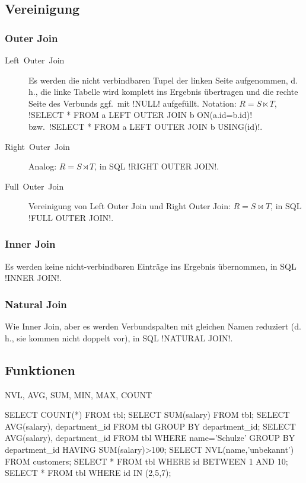 \subsection{Vereinigung}


\subsubsection{Outer Join}
\begin{description}
  \item [{Left~Outer~Join}] Es werden die nicht verbindbaren Tupel der linken Seite aufgenommen, d.\,h., die linke Tabelle wird komplett ins Ergebnis übertragen und die rechte Seite des Verbunds ggf.~mit \sqli!NULL! aufgefüllt.
  Notation: $R=S\ltimes T$, \sqli!SELECT * FROM a LEFT OUTER JOIN b ON(a.id=b.id)! bzw.~\sqli!SELECT * FROM a LEFT OUTER JOIN b USING(id)!.
  \item [{Right~Outer~Join}] Analog: $R=S\rtimes T$, in SQL \sqli!RIGHT OUTER JOIN!.
   \item [{Full~Outer~Join}] Vereinigung von Left Outer Join und Right Outer Join: $R=S\bowtie T$, in SQL \sqli!FULL OUTER JOIN!.
\end{description}

\subsubsection{Inner Join}

Es werden keine nicht-verbindbaren Einträge ins Ergebnis übernommen, in SQL \sqli!INNER JOIN!.


\subsubsection{Natural Join}

Wie Inner Join, aber es werden Verbundspalten mit gleichen Namen reduziert (d.\,h., sie kommen nicht doppelt vor), in SQL \sqli!NATURAL JOIN!.


\subsection{Funktionen}

NVL, AVG, SUM, MIN, MAX, COUNT

\begin{sqlcode}
SELECT COUNT(*) FROM tbl;
SELECT SUM(salary) FROM tbl;
SELECT AVG(salary), department_id
  FROM tbl
  GROUP BY department_id;
SELECT AVG(salary), department_id
  FROM tbl
  WHERE name='Schulze'
  GROUP BY department_id
  HAVING SUM(salary)>100;
SELECT NVL(name,'unbekannt') FROM customers;
SELECT * FROM tbl WHERE id BETWEEN 1 AND 10;
SELECT * FROM tbl WHERE id IN (2,5,7);
\end{sqlcode}



